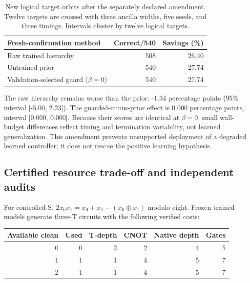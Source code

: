 \begin{table}[htbp]\centering\small

\begin{tabular}{@{}lrr@{}}\toprule

Fresh-confirmation method & Correct/540 & Savings (\%) \\\midrule

Raw trained hierarchy & 508 & 26.40 \\

Untrained prior & 540 & 27.74 \\

Validation-selected guard ($\beta=0$) & 540 & 27.74 \\

\bottomrule\end{tabular}

\caption{New logical target orbits after the separately declared amendment. Twelve targets are crossed with three ancilla widths, five seeds, and three timings. Intervals cluster by twelve logical targets.}\label{tab:confirmation}\end{table}

The raw hierarchy remains worse than the prior: -1.34 percentage points (95\% interval [-5.00, 2.23]). The guarded-minus-prior effect is 0.000 percentage points, interval [0.000, 0.000]. Because their scores are identical at $\beta=0$, small wall-budget differences reflect timing and termination variability, not learned generalization. This amendment prevents unsupported deployment of a degraded learned controller; it does not rescue the positive learning hypothesis.

\subsection{Certified resource trade-off and independent audits}

For controlled-S, $2x_0x_1=x_0+x_1-(x_0\oplus x_1)$ modulo eight. Frozen trained models generate three-T circuits with the following verified costs:

\begin{center}\small\begin{tabular}{@{}rrrrrr@{}}\toprule

Available clean & Used & T-depth & CNOT & Native depth & Gates \\\midrule

0 & 0 & 2 & 2 & 4 & 5 \\

1 & 1 & 1 & 4 & 5 & 7 \\

2 & 1 & 1 & 4 & 5 & 7 \\\bottomrule\end{tabular}\end{center}

